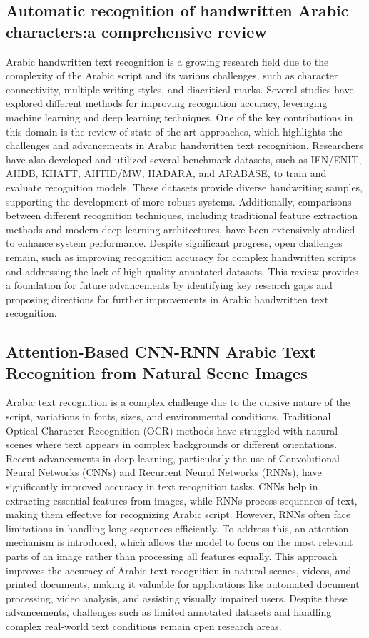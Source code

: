\documentclass{article}
\begin{document}
\subsection{Automatic recognition of handwritten Arabic characters:a comprehensive review}Arabic handwritten text recognition is a growing research field due to the complexity of the Arabic script and its various challenges, such as character connectivity, multiple writing styles, and diacritical marks. Several studies have explored different methods for improving recognition accuracy, leveraging machine learning and deep learning techniques. One of the key contributions in this domain is the review of state-of-the-art approaches, which highlights the challenges and advancements in Arabic handwritten text recognition. Researchers have also developed and utilized several benchmark datasets, such as IFN/ENIT, AHDB, KHATT, AHTID/MW, HADARA, and ARABASE, to train and evaluate recognition models. These datasets provide diverse handwriting samples, supporting the development of more robust systems. Additionally, comparisons between different recognition techniques, including traditional feature extraction methods and modern deep learning architectures, have been extensively studied to enhance system performance. Despite significant progress, open challenges remain, such as improving recognition accuracy for complex handwritten scripts and addressing the lack of high-quality annotated datasets. This review provides a foundation for future advancements by identifying key research gaps and proposing directions for further improvements in Arabic handwritten text recognition.
\subsection{Attention-Based CNN-RNN Arabic Text Recognition from Natural Scene Images}Arabic text recognition is a complex challenge due to the cursive nature of the script, variations in fonts, sizes, and environmental conditions. Traditional Optical Character Recognition (OCR) methods have struggled with natural scenes where text appears in complex backgrounds or different orientations. Recent advancements in deep learning, particularly the use of Convolutional Neural Networks (CNNs) and Recurrent Neural Networks (RNNs), have significantly improved accuracy in text recognition tasks. CNNs help in extracting essential features from images, while RNNs process sequences of text, making them effective for recognizing Arabic script. However, RNNs often face limitations in handling long sequences efficiently. To address this, an attention mechanism is introduced, which allows the model to focus on the most relevant parts of an image rather than processing all features equally. This approach improves the accuracy of Arabic text recognition in natural scenes, videos, and printed documents, making it valuable for applications like automated document processing, video analysis, and assisting visually impaired users. Despite these advancements, challenges such as limited annotated datasets and handling complex real-world text conditions remain open research areas.
\end{document}

